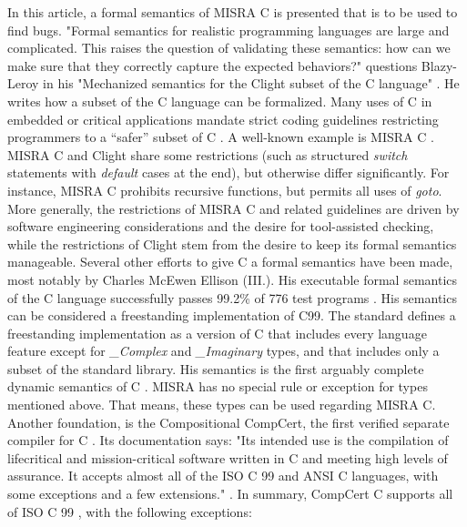 \begin{minipage}{\linewidth}
\begin{multicols*}{2}
		In this article, a formal semantics of \gls{MISRA} C is presented that is to be used to find bugs. "Formal semantics for realistic programming languages are large and complicated. This raises the question of validating these semantics: how can we make sure that they correctly capture the expected behaviors?" questions Blazy-Leroy in his "Mechanized semantics for the Clight subset of the C language" \cite{Blazy}. He writes how a subset of the C language can be formalized. Many uses of C in embedded or critical applications mandate strict coding guidelines restricting programmers to a “safer” subset of C \cite{HATTON2004465}. A well-known example is \gls{MISRA} C \cite{MISRA2004}. \gls{MISRA} C and Clight \cite{Blazy} share some restrictions (such as structured \textit{switch} statements with \textit{default} cases at the end), but otherwise differ significantly. For instance, \gls{MISRA} C prohibits recursive functions, but permits all uses of \textit{goto}. More generally, the restrictions of \gls{MISRA} C and related guidelines are driven by software engineering considerations and the desire for tool-assisted checking, while the restrictions of Clight stem from the desire to keep its formal semantics manageable. \cite{kutmod}
		Several other efforts to give C a formal semantics have been made, most notably by Charles McEwen Ellison (III.). His executable formal semantics of the C language successfully passes  99.2\% of 776 test programs \cite{Ellison:2012:EFS:2103621.2103719} \cite{kutmod}. His semantics can be considered a freestanding implementation of C99. The standard defines a freestanding implementation as a version of C that includes every language feature except for \textit{\_Complex} and \textit{\_Imaginary} types, and that includes only a subset
		of the standard library. His semantics is the first arguably complete
		dynamic semantics of C \cite{Ellison:2012:EFS:2103621.2103719}. \gls{MISRA} has no special rule or exception for types mentioned above. That means, these types can be used regarding \gls{MISRA} C. 
		Another foundation, is the Compositional CompCert, the first verified separate compiler for C \cite{Stewart:2015:CC:2775051.2676985}. Its documentation says: "Its intended use is the compilation of lifecritical and mission-critical software written in C and meeting high levels of assurance. It accepts almost	all of the ISO C 99 and ANSI C languages, with some exceptions and a few extensions." \cite{CompCert}. In summary, CompCert C supports all of ISO C 99 \cite{ISO:1999:IIP}, with the following exceptions:
		\begin{itemize}

\end{itemize}
\end{multicols*}
\end{minipage}
